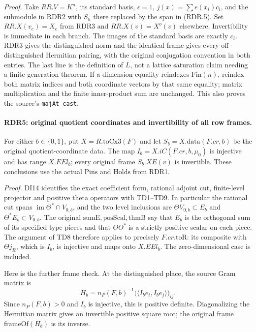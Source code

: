 \emph{Proof.}
Take \(RR.V=K^n\), its standard basis, \(\epsilon=1\),
\(j(x)=\sum e(x_i)c_i\), and the submodule in RDR2 with
\(S_u\) there replaced by the span in (RDR.5).  Set
\(RR.X(v_e)=X_e\) from RDR3 and \(RR.X(v)=X^o(v)\)
elsewhere.  Invertibility is immediate in each branch.
The images of the standard basis are exactly \(c_i\).
RDR3 gives the distinguished norm and the identical frame
gives every off-distinguished Hermitian pairing, with the
original conjugation convention in both entries.  The last
line is the definition of \(L\), not a lattice saturation
claim needing a finite generation theorem.  If a dimension
equality reindexes \(\mathrm{Fin}(n)\), reindex both matrix
indices and both coordinate vectors by that same equality;
matrix multiplication and the finite inner-product sum are
unchanged.  This also proves the source's \texttt{majAt\_cast}.

\paragraph{RDR5: original quotient coordinates and invertibility of all row frames.}
\label{claim:RDR5}
For either \(b\in\{0,1\}\), put \(X=R.\mathrm{toCx3}(F)\)
and let \(S_b=X.\mathrm{data}(F.cr,b)\) be the original
quotient-coordinate data.  The map
\(I_b=X.iC(F.cr,b,\mu_0)\) is injective and has range
\(X.EEl_b\); every original frame \(S_b.XE(v)\) is invertible.
These conclusions use the actual \(\mathrm{Pins}\) and
\(\mathrm{Holds}\) from RDR1.

\emph{Proof.}
DI14 identifies the exact coefficient form, rational adjoint cut,
finite-level projector and positive theta operators with TD1--TD9.
In particular the rational cut spans
\(\operatorname{im}\Theta^*\cap V_{0,b}\), and the two
level inclusions are \(\Theta V_{0,b}\subset E_b\) and
\(\Theta^*E_b\subset V_{0,b}\).  The original
\(\mathrm{sumE,posScal,thmB}\) say that \(E_b\) is the
orthogonal sum of its specified type pieces and that
\(\Theta\Theta^*\) is a strictly positive scalar on each
piece.  The argument of TD8 therefore applies to precisely
\(F.cr.\mathrm{toR}\): its composite with \(\Theta j_R\),
which is \(I_b\), is injective and maps onto \(X.EEl_b\).
The zero-dimensional case is included.

Here is the further frame check.  At the distinguished place,
the source Gram matrix is
\[
        H_b=n_P(F,b)^{-1}
              \bigl(\langle I_b e_i,I_b e_j\rangle\bigr)_{ij}.
                                                               \tag{RDR.6}
\]
Since \(n_P(F,b)>0\) and \(I_b\) is injective, this is positive
definite.  Diagonalizing the Hermitian matrix gives an invertible
positive square root; the original frame \(\mathrm{frameOf}(H_b)\)
is its inverse.

